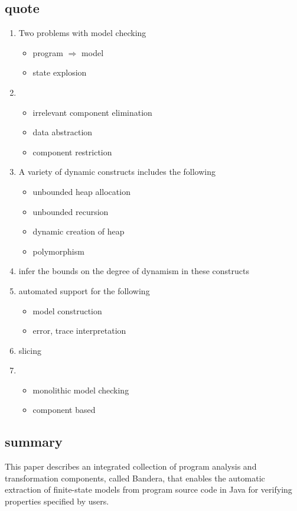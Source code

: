 \documentclass{llncs}
\begin{document}
\subsection{quote}
\begin{enumerate}
\item Two problems with model checking
\begin{itemize}
\item program $\Rightarrow$ model
\item state explosion
\end{itemize}

\item
\begin{itemize}
\item irrelevant component elimination
\item data abstraction
\item component restriction
\end{itemize}

\item
A variety of dynamic constructs includes the following
\begin{itemize}
\item unbounded heap allocation
\item unbounded recursion
\item dynamic creation of heap
\item polymorphism
\end{itemize}

\item infer the bounds on the degree of dynamism in these constructs

\item automated support for the following
\begin{itemize}
\item model construction
\item error, trace interpretation
\end{itemize}

\item slicing

\item
\begin{itemize}
\item monolithic model checking
\item component based
\end{itemize}
\end{enumerate}

\subsection{summary}
This paper describes an integrated collection of program analysis and transformation components, 
called Bandera, that enables the automatic extraction of finite-state models from program 
source code in Java for verifying properties specified by users. 
\end{document}
